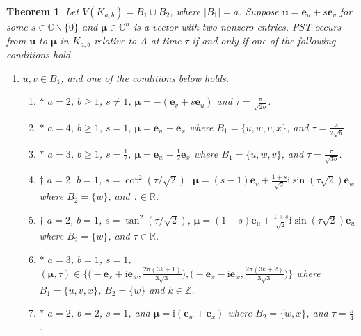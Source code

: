 \documentclass[10pt,a4paper]{amsart}
\newtheorem{theorem}{Theorem}
\def\C{\mathbb{C}}
\def\R{\mathbb{R}}
\def\Z{\mathbb{Z}}
\newcommand{\be}{\mathbf e}
\newcommand{\bmu}{{\boldsymbol{\mu}}}
\newcommand{\bu}{\mathbf u}
\def\ii{\mathrm{i}}
\begin{document}
\begin{theorem}
\label{Thm:kmnPSTc1}
Let $V(K_{a,b})=B_1\cup B_2$, where $|B_1|=a$. Suppose $\bu=\be_u+s\be_v$ for some $s\in\C\backslash\{0\}$ and $\bmu\in\C^n$ is a vector with two nonzero entries. PST occurs from $\bu$ to $\bmu$ in $K_{a,b}$ relative to $A$ at time $\tau$ if and only if one of the following conditions hold.
\begin{enumerate}
\item $u,v\in B_1$, and one of the conditions below holds.
\begin{enumerate}

\item $*$ $a=2$, $b\geq 1$, $s\neq 1$, $\bmu=-(\be_v+s\be_u)$ and $\tau=\frac{\pi}{\sqrt{2b}}$. 

\item $*$ $a=4$, $b\geq 1$, $s=1$, $\bmu=\be_w+\be_x$ where $B_1=\{u,w,v,x\}$, and $\tau=\frac{\pi}{2\sqrt{b}}$. 

\item $*$ $a=3$, $b\geq 1$, $s=\frac{1}{2}$, $\bmu=\be_w+\frac{1}{2}\be_x$ where $B_1=\{u,w,v\}$, and $\tau=\frac{\pi}{\sqrt{3b}}$. 

\item $\dagger$ $a=2$, $b=1$, $s=\cot^2(\tau/\sqrt{2})
$, $\bmu=(s-1)\be_v+\frac{1+s}{\sqrt{2}}\ii\sin(\tau\sqrt{2})\be_w$ where $B_2=\{w\}$, and $\tau\in\R$.
\item $\dagger$ $a=2$, $b=1$, $s=\tan^2(\tau/\sqrt{2})$, $\bmu=(1-s)\be_u+\frac{1+s}{\sqrt{2}}\ii\sin(\tau\sqrt{2})\be_w$ where $B_2=\{w\}$, and $\tau\in\R$.

\item $*$ $a=3$, $b=1$, $s=1$, $(\bmu,\tau)\in\{\big(-\be_x+\ii\be_w,\frac{2\pi(3k+1)}{3\sqrt{3}}\big),\big(-\be_x-\ii\be_w,\frac{2\pi(3k+2)}{3\sqrt{3}}\big)\}$ where $B_1=\{u,v,x\}$, $B_2=\{w\}$ and $k\in\Z$.

\item $*$ $a=2$, $b=2$, $s=1$, and $\bmu=\ii(\be_w+\be_x)$ where $B_2=\{w,x\}$, and $\tau=\frac{\pi}{4}$.
\end{enumerate}


\end{enumerate}
\end{theorem}
\end{document}
